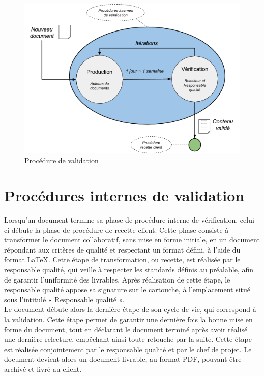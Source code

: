 \begin{figure}[H]
    \centering
    \label{fig-valid}
    \includegraphics[scale=0.5]{figures/validation_part.png}
    \caption{Procédure de validation}
\end{figure}

\section{Procédures internes de validation}
    
Lorsqu’un document termine sa phase de procédure interne de vérification, celui-ci débute la phase de procédure de recette client. Cette phase consiste à transformer le document collaboratif, sans mise en forme initiale, en un document répondant aux critères de qualité et respectant un format défini, à l’aide du format LaTeX. Cette étape de transformation, ou recette, est réalisée par le responsable qualité, qui veille à respecter les standards définis au préalable, afin de garantir l’uniformité des livrables. Après réalisation de cette étape, le responsable qualité appose sa signature sur le cartouche, à l’emplacement situé sous l’intitulé « Responsable qualité ». \\
 
Le document débute alors la dernière étape de son cycle de vie, qui correspond à la validation. Cette étape permet de garantir une dernière fois la bonne mise en forme du document, tout en déclarant le document terminé après avoir réalisé une dernière relecture, empêchant ainsi toute retouche par la suite. Cette étape est réalisée conjointement par le responsable qualité et par le chef de projet. Le document devient alors un document livrable, au format PDF, pouvant être archivé et livré au client. \\
 
